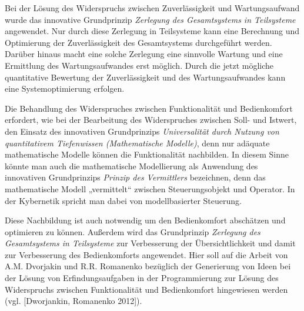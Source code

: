 \documentclass[11pt,a4paper]{article}
\begin{document}
Bei der Lösung des Widerspruchs zwischen Zuverlässigkeit und Wartungsaufwand
wurde das innovative Grundprinzip \emph{Zerlegung des Gesamtsystems in
  Teilsysteme} angewendet. Nur durch diese Zerlegung in Teilsysteme kann eine
Berechnung und Optimierung der Zuverlässigkeit des Gesamtsystems durchgeführt
werden. Darüber hinaus macht eine solche Zerlegung eine sinnvolle Wartung und
eine Ermittlung des Wartungsaufwandes erst möglich. Durch die jetzt mögliche
quantitative Bewertung der Zuverlässigkeit und des Wartungsaufwandes kann eine
Systemoptimierung erfolgen.

Die Behandlung des Widerspruches zwischen Funktionalität und Bedienkomfort
erfordert, wie bei der Bearbeitung des Widerspruches zwischen Soll- und
Istwert, den Einsatz des innovativen Grundprinzips \emph{Universalität durch
  Nutzung von quantitativem Tiefenwissen (Mathematische Modelle)}, denn nur
adäquate mathematische Modelle können die Funktionalität nachbilden. In diesem
Sinne könnte man auch die mathematische Modellierung als Anwendung des
innovativen Grundprinzips \emph{Prinzip des Vermittlers} bezeichnen, denn das
mathematische Modell „vermittelt“ zwischen Steuerungsobjekt und Operator. In
der Kybernetik spricht man dabei von modellbasierter Steuerung.

Diese Nachbildung ist auch notwendig um den Bedienkomfort abschätzen und
optimieren zu können. Außerdem wird das Grundprinzip \emph{Zerlegung des
Gesamtsystems in Teilsysteme} zur Verbesserung der Übersichtlichkeit und damit
zur Verbesserung des Bedienkomforts angewendet. Hier soll auf die Arbeit von
A.M. Dvorjakin und R.R. Romanenko bezüglich der Generierung von Ideen bei der
Lösung von Erfindungsaufgaben in der Programmierung zur Lösung des Widerspruchs
zwischen Funktionalität und Bedienkomfort hingewiesen werden (vgl. [Dworjankin,
Romanenko 2012]).
\end{document}
